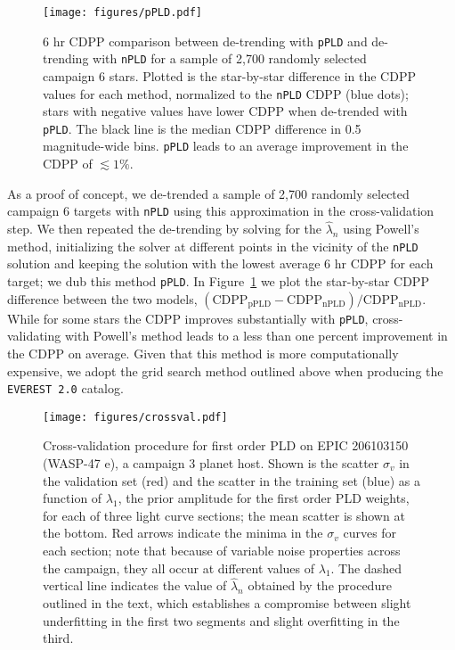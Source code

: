 \documentclass[]{emulateapj}
\begin{document}
\begin{figure}[hbt]
  \begin{center}
      \texttt{[image: figures/pPLD.pdf]}
       \caption{6 hr CDPP comparison between de-trending with \texttt{pPLD} and
                de-trending with \texttt{nPLD} for a sample of 2,700 randomly selected campaign 6
                stars. Plotted is the star-by-star difference in the CDPP values for each method,
                normalized to the \texttt{nPLD} CDPP (blue dots); stars with negative values have lower CDPP
                when de-trended with \texttt{pPLD}. The black line is the median CDPP difference
                in 0.5 magnitude-wide bins. \texttt{pPLD} leads to an average improvement
                in the CDPP of ${\lesssim}1\%$.}
     \label{fig:pPLD}
  \end{center}
\end{figure}

As a proof of concept, we de-trended a sample of 2,700 randomly selected campaign 6 targets
with \texttt{nPLD} using this approximation in the cross-validation step.
We then repeated the de-trending by
solving for the $\hat{\lambda}_n$ using Powell's method, initializing the solver at different
points in the vicinity of the \texttt{nPLD} solution and keeping the solution with the lowest
average 6 hr CDPP \citep[combined differential photometric precision;][]{Christiansen12} for each target; we dub this method
\texttt{pPLD}. In Figure~\ref{fig:pPLD} we plot
the star-by-star CDPP difference between the two models,
$\mathrm{(CDPP_{pPLD} - CDPP_{nPLD})/CDPP_{nPLD}}$. While for some stars the CDPP improves
substantially with \texttt{pPLD}, cross-validating with Powell's method
leads to a less than one percent improvement in the CDPP on average. Given that this method
is more computationally expensive, we adopt the grid search method outlined above when
producing the \texttt{EVEREST 2.0} catalog.

\begin{figure}[hbt]
  \begin{center}
      \texttt{[image: figures/crossval.pdf]}
       \caption{Cross-validation procedure for first order PLD on EPIC 206103150
       (WASP-47 e), a campaign 3 planet host. Shown is the scatter $\sigma_v$ in the validation
       set (red) and the scatter in the training set (blue) as a function of $\lambda_1$,
       the prior amplitude for the first order PLD weights, for each of three light curve
       sections; the mean scatter is shown at the bottom. Red arrows indicate the minima
       in the $\sigma_v$ curves for each section; note that because of variable noise
       properties across the campaign, they all occur at different values of $\lambda_1$.
       The dashed vertical line indicates the value of $\hat{\lambda}_n$ obtained by the
       procedure outlined in the text, which establishes a compromise between
       slight underfitting in the first two segments and slight overfitting in the
       third.
       }
     \label{fig:crossval}
  \end{center}
\end{figure}
\end{document}
